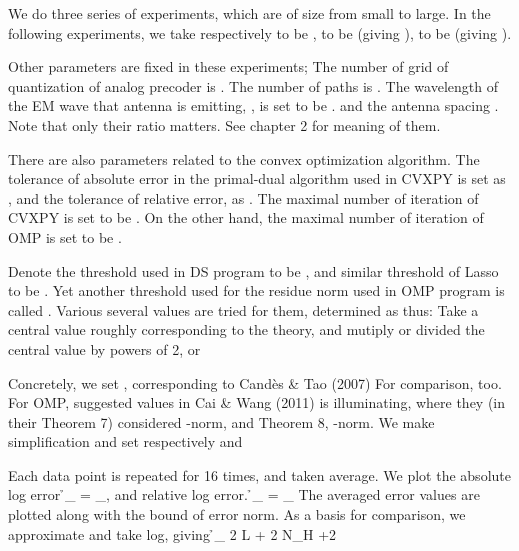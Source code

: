 \stopsubsection

\stopsection

\startsection [title={Result}]

\startsubsection [title={Settings}]

We do three series of experiments, which are of size from small to large.
In the following experiments, we take respectively  to be ,  to be  (giving ),  to be  (giving ).

Other parameters are fixed in these experiments; 
The number of grid of quantization of analog precoder is .
The number of paths  is .
The wavelength of the EM wave that antenna is emitting, , is set to be .
and the antenna spacing .
Note that only their ratio matters.
See chapter 2 for meaning of them.

There are also parameters related to the convex optimization algorithm.
The tolerance of absolute error in the primal-dual algorithm used in CVXPY is set as , and the tolerance of relative error, as .
The maximal number of iteration of CVXPY is set to be .
On the other hand, the maximal number of iteration of OMP is set to be .

Denote the threshold used in DS program to be , and similar threshold of Lasso to be .
Yet another threshold used for the residue norm used in OMP program is called \m {\eta}.
Various several values are tried for them, determined as thus: Take a central value roughly corresponding to the theory, and mutiply or divided the central value by powers of 2, or 

Concretely, we set , corresponding to Cand\`es \& Tao (2007)
For comparison,  too.
For OMP, suggested values in Cai \& Wang (2011) is illuminating, where they (in their Theorem 7) considered -norm, and Theorem 8, \m {\ell _\infty}-norm.
We make simplification and set respectively  and 

Each data point is repeated for 16 times, and taken average.
We plot the absolute log error
%
 {
\NC \h_{}
=\NC {} _{}, \NR
}
%
and relative log error.
%
 {
\NC \h_{}
=\NC {}
{ _{}} \NR
}
%
The averaged error values are plotted along with the bound of error norm.
As a basis for comparison, we approximate  and take log, giving
%
 {
\NC \h_{}
\eqsim \NC {} {2} \log L + {2} \log \log N_H +2 \NR
}

